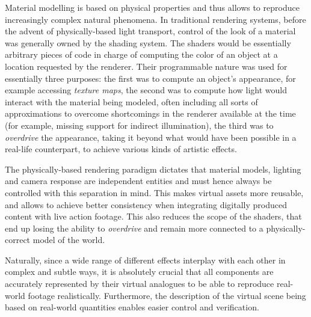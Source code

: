 Material modelling is based on physical properties and thus allows to reproduce 
increasingly complex natural phenomena. 
In traditional rendering systems, before the advent of physically-based light transport, 
control of the look of a material was generally owned by the \gls{shading system}.
The \glspl{shader} would be essentially arbitrary pieces of code in charge of computing
the color of an object at a location requested by the renderer. 
Their programmable nature was used for essentially three purposes:
the first was to compute an object's appearance, for example accessing \emph{texture maps},
the second was to compute how light would interact with the material being modeled, often including
all sorts of approximations to overcome shortcomings in the renderer available at the time 
(for example, missing support for indirect illumination),
the third was to \emph{overdrive} the appearance, taking it beyond what would have been possible in a real-life
counterpart, to achieve various kinds of artistic effects.

The physically-based rendering paradigm dictates that \glspl{material model},
lighting and camera response are independent entities and
must hence always be controlled with this separation in mind. 
This makes \gls{virtual} assets more reusable, 
and allows to achieve better consistency when integrating 
digitally produced content with live action \gls{footage}.
This also reduces the scope of the shaders, that end up losing the ability
to \emph{overdrive} and remain more connected to a physically-correct 
model of the world.

Naturally, since a wide range of different effects interplay with each
other in complex and subtle ways, it is absolutely crucial that all
components are accurately represented by their virtual analogues to be
able to reproduce real-world footage realistically. 
Furthermore, the description of the \gls{virtual scene} being based on
real-world quantities enables easier control and verification.




